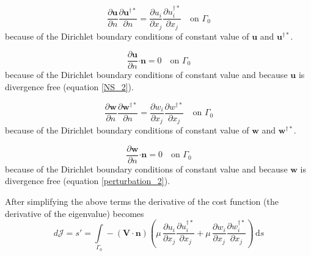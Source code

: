 \documentclass[12pt, a4paper]{article}
\begin{document}
    \begin{equation*}
        \frac{\partial \mathbf{u}}{\partial n} \frac{\partial \mathbf{u^{\dagger*}}}{\partial n} = 
        \frac{\partial u_i}{\partial x_j} \frac{\partial u^{\dagger*}_i}{\partial x_j}
        \quad \text{on } \Gamma_0
    \end{equation*}
    because of the Dirichlet boundary conditions of constant value of $\mathbf{u}$ and $\mathbf{u^{\dagger*}}$.
    
    \begin{equation*}
        \frac{\partial \mathbf{u}}{\partial n} \mathbf{\cdot n} = 0 \quad \text{on } \Gamma_0
    \end{equation*}
    because of the Dirichlet boundary conditions of constant value and because $\mathbf{u}$ is divergence free (equation \ref{NS_2}).
    
    \begin{equation*}
        \frac{\partial \mathbf{w}}{\partial n} \frac{\partial \mathbf{w^{\dagger*}}}{\partial n} = 
        \frac{\partial w_i}{\partial x_j} \frac{\partial w^{\dagger*}}{\partial x_j}
        \quad \text{on } \Gamma_0
    \end{equation*}
    because of the Dirichlet boundary conditions of constant value of $\mathbf{w}$ and $\mathbf{w^{\dagger*}}$.
    
    \begin{equation*}
        \frac{\partial \mathbf{w}}{\partial n} \mathbf{\cdot n} = 0 \quad \text{on } \Gamma_0
    \end{equation*}
    because of the Dirichlet boundary conditions of constant value and because $\mathbf{w}$ is divergence free (equation \ref{perturbation_2}).
    
    After simplifying the above terms the derivative of the cost function (the derivative of the eigenvalue) becomes 
    \begin{equation}
        d \mathcal{J} = s' = \int\limits_{\Gamma_0} - (\mathbf{V \cdot n}) \left( 
            \mu \, \frac{\partial u_i}{\partial x_j} \frac{\partial u^{\dagger*}_i}{\partial x_j} + 
            \mu \, \frac{\partial w_i}{\partial x_j} \frac{\partial w^{\dagger*}_i}{\partial x_j}
        \right) \, \mathrm{d} s 
    \end{equation}
    



        
\end{document}
